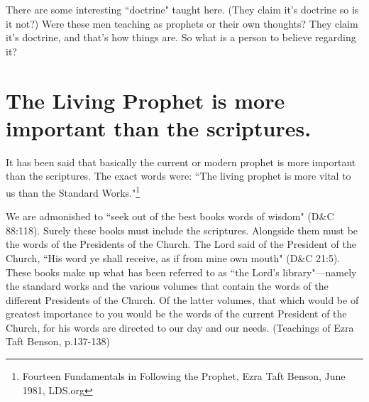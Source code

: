 There are some interesting ``doctrine" taught here. (They claim it's doctrine so
is it not?) Were these men teaching as prophets or their own thoughts? They claim
it's doctrine, and that's how things are. So what is a person to believe regarding
it?

\section{The Living Prophet is more important than the scriptures.}

It has been said that basically the current or modern prophet is more important than
the scriptures. The exact words were: 
``The living prophet is more vital to us than the Standard Works."\footnote{Fourteen 
Fundamentals in Following the Prophet, Ezra Taft Benson, June 1981, LDS.org}

\begin{displayquote}
We are admonished to ``seek out of the best books words of wisdom" (D\&C 88:118). 
Surely these books must include the scriptures. Alongside them must be the words of 
the Presidents of the Church. The Lord said of the President of the Church, ``His 
word ye shall receive, as if from mine own mouth" (D\&C 21:5). These books make up 
what has been referred to as ``the Lord’s library"—namely the standard works and 
the various volumes that contain the words of the different Presidents of the Church. 
Of the latter volumes, that which would be of greatest importance to you would be 
the words of the current President of the Church, for his words are directed to our 
day and our needs. (Teachings of Ezra Taft Benson, p.137-138)
\end{displayquote}

